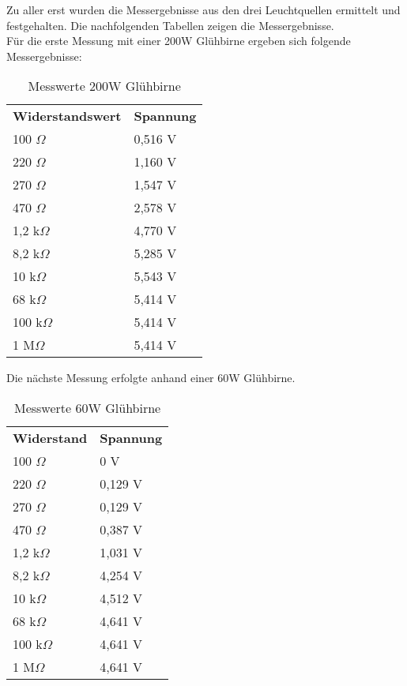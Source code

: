 Zu aller erst wurden die Messergebnisse aus den drei Leuchtquellen ermittelt und festgehalten. Die nachfolgenden Tabellen zeigen die Messergebnisse.\\
Für die erste Messung mit einer 200W Glühbirne ergeben sich folgende Messergebnisse:\\
\begin{table}[htb]
\centering
\caption{Messwerte 200W Glühbirne}
    \label{tab:Messwerte 200W Glühbirne}
 \begin{tabular}{ll}
  \textbf{Widerstandswert} & \textbf{Spannung} \\
  100 $ \Omega $ & 0,516 V \\
  220 $ \Omega $ & 1,160 V \\
  270 $ \Omega $ & 1,547 V \\
  470 $ \Omega $ & 2,578 V \\
  1,2 k$ \Omega $ & 4,770 V \\
  8,2 k$ \Omega $ & 5,285 V \\
  10 k$ \Omega $ & 5,543 V \\
  68 k$ \Omega $ & 5,414 V \\
  100 k$ \Omega $ & 5,414 V \\
  1 M$ \Omega $ & 5,414 V \\
 \end{tabular}
\end{table}

Die nächste Messung erfolgte anhand einer 60W Glühbirne.
\begin{table}
\centering
\caption{Messwerte 60W Glühbirne}
\label{tab:Messwerte 60W Glühbirne}
 \begin{tabular}{ll}
  \textbf{Widerstand} & \textbf{Spannung} \\
  100 $ \Omega $ & 0 V\\
  220 $ \Omega $ & 0,129 V\\
  270 $ \Omega $ & 0,129 V\\
  470 $ \Omega $ & 0,387 V\\
  1,2 k$ \Omega $ & 1,031 V\\
  8,2 k$ \Omega $ & 4,254 V \\
  10 k$ \Omega $ & 4,512 V \\
  68 k$ \Omega $ & 4,641 V \\
  100 k$ \Omega $ & 4,641 V \\
  1 M$ \Omega $ & 4,641 V \\
 \end{tabular}
\end{table}

